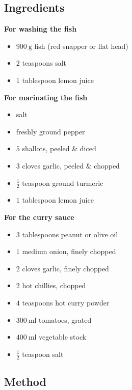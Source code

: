 \documentclass[11pt,a4paper]{article}
\begin{document}
\subsection*{Ingredients}

\begin{multicols}{2}

\textbf{For washing the fish}

\begin{itemize}
  \item $ \qty{900}{\gram}$ fish (red snapper or flat head)
  \item $ 2 $ teaspoons salt
  \item $ 1 $ tablespoon lemon juice
\end{itemize}

\textbf{For marinating the fish}

\begin{itemize}
  \item salt
  \item freshly ground pepper
  \item $ 5 $ shallots, peeled \& diced
  \item $ 3 $ cloves garlic, peeled \& chopped
  \item $ \frac{1}{2} $ teaspoon ground turmeric
  \item $ 1 $ tablespoon lemon juice
\end{itemize}

\columnbreak{}

\textbf{For the curry sauce}

\begin{itemize}
  \item $ 3 $ tablespoons peanut or olive oil
  \item $ 1 $ medium onion, finely chopped
  \item $ 2 $ cloves garlic, finely chopped
  \item $ 2 $ hot chillies, chopped
  \item $ 4 $ teaspoons hot curry powder
  \item $ \qty{300}{\ml} $ tomatoes, grated
  \item $ \qty{400}{\ml} $ vegetable stock
  \item $ \frac{1}{2} $ teaspoon salt
\end{itemize}

\end{multicols}

\medskip

\subsection*{Method}
\end{document}
